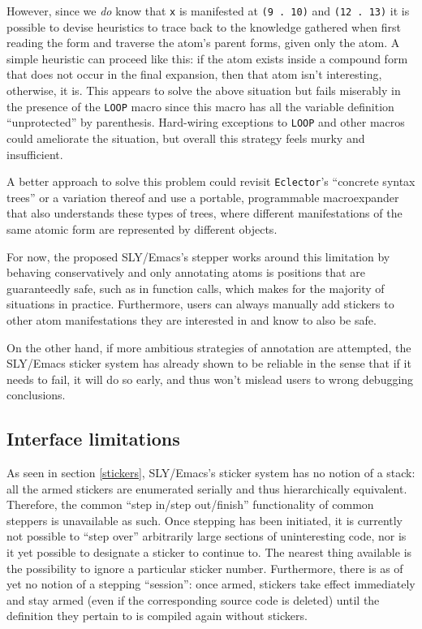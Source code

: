 \documentclass[sigconf]{acmart}
\begin{document}
However, since we \emph{do} know that \texttt{x} is manifested at
\texttt{(9 . 10)} and \texttt{(12 . 13)} it is possible to devise
heuristics to trace back to the knowledge gathered when first reading
the form and traverse the atom's parent forms, given only the atom.  A
simple heuristic can proceed like this: if the atom exists inside a
compound form that does not occur in the final expansion, then that
atom isn't interesting, otherwise, it is.  This appears to solve the
above situation but fails miserably in the presence of the
\texttt{LOOP} macro since this macro has all the variable definition
``unprotected'' by parenthesis.  Hard-wiring exceptions to
\texttt{LOOP} and other macros could ameliorate the situation, but
overall this strategy feels murky and insufficient.

A better approach to solve this problem could revisit
\texttt{Eclector}'s ``concrete syntax trees'' or a variation thereof
and use a portable, programmable macroexpander that also understands
these types of trees, where different manifestations of the same
atomic form are represented by different objects.

For now, the proposed SLY/Emacs's stepper works around this limitation
by behaving conservatively and only annotating atoms is positions that
are guaranteedly safe, such as in function calls, which makes for the
majority of situations in practice.  Furthermore, users can always
manually add stickers to other atom manifestations they are interested
in and know to also be safe.

On the other hand, if more ambitious strategies of annotation are
attempted, the SLY/Emacs sticker system has already shown to be
reliable in the sense that if it needs to fail, it will do so early,
and thus won't mislead users to wrong debugging conclusions.

\subsection{Interface limitations}

As seen in section \ref{stickers}, SLY/Emacs's sticker system has no
notion of a stack: all the armed stickers are enumerated serially and
thus hierarchically equivalent.  Therefore, the common ``step in/step
out/finish'' functionality of common steppers is unavailable as such.
Once stepping has been initiated, it is currently not possible to
``step over'' arbitrarily large sections of uninteresting code, nor is
it yet possible to designate a sticker to continue to.  The nearest
thing available is the possibility to ignore a particular sticker
number.  Furthermore, there is as of yet no notion of a stepping
``session'': once armed, stickers take effect immediately and stay
armed (even if the corresponding source code is deleted) until the
definition they pertain to is compiled again without stickers.
\end{document}
